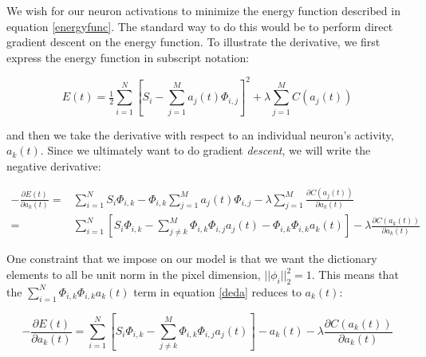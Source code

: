 We wish for our neuron activations to minimize the energy function described in equation \eqref{energyfunc}. The standard way to do this would be to perform direct gradient descent on the energy function. To illustrate the derivative, we first express the energy function in subscript notation:

\begin{equation}
    E(t) = \tfrac{1}{2} \sum\limits_{i=1}^{N} \left[ S_{i} - \sum\limits_{j=1}^{M}a_{j}(t) \Phi_{i,j} \right]^{2} + \lambda \sum\limits_{j=1}^{M} C(a_{j}(t))
\label{indexenergyfunc}
\end{equation}

and then we take the derivative with respect to an individual neuron's activity, $a_{k}(t)$. Since we ultimately want to do gradient \textit{descent}, we will write the negative derivative:

\begin{align}\label{deda}
    - \frac{\partial E(t)}{\partial a_{k}(t)}
    =
        &\sum\limits_{i=1}^{N} S_{i} \Phi_{i,k} -
        \Phi_{i,k}\sum\limits_{j=1}^{M}a_{j}(t) \Phi_{i,j} -
        \lambda \sum\limits_{j=1}^{M}\frac{\partial C(a_{j}(t))}{\partial a_{k}(t)} \\
    =
        &\sum\limits_{i=1}^{N} \left[ S_{i} \Phi_{i,k} -
        \sum\limits_{j \neq k}^{M} \Phi_{i,k} \Phi_{i,j} a_{j}(t) - \Phi_{i,k}\Phi_{i,k}a_{k}(t) \right] -
        \lambda \frac{\partial C(a_{k}(t))}{\partial a_{k}(t)}
\end{align}

One constraint that we impose on our model is that we want the dictionary elements to all be unit norm in the pixel dimension, $||\phi_{i}||_2^2 = 1$. This means that the $\sum_{i=1}^{N}\Phi_{i,k}\Phi_{i,k}a_{k}(t)$ term in equation \eqref{deda} reduces to $a_k(t)$:

\begin{equation}
    -\frac{\partial E(t)}{\partial a_{k}(t)} =
    \sum\limits_{i=1}^{N} \left[ S_{i} \Phi_{i,k} -
    \sum\limits_{j \neq k}^{M} \Phi_{i,k} \Phi_{i,j} a_{j}(t) \right] - a_{k}(t) -
    \lambda \frac{\partial C(a_{k}(t))}{\partial a_{k}(t)}
\label{dedasimple}
\end{equation}

